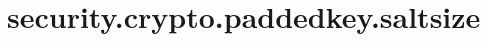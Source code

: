 \section{security.crypto.paddedkey.saltsize}
\label{configuration:SecurityCryptoPaddedkeySaltsize}
\AvailableInJavaOnly{\TODO}